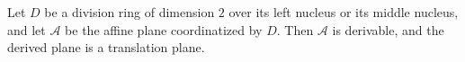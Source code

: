 Let $D$ be a division ring of dimension $2$ over its left nucleus or its middle nucleus, and let $\mathcal{A}$ be the affine plane coordinatized by $D$. Then $\mathcal{A}$ is derivable, and the derived plane is a translation plane.
